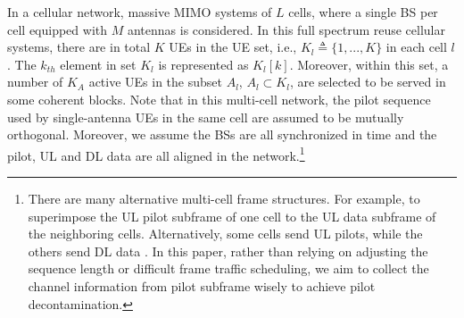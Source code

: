 In a cellular network, massive MIMO systems of $L$ cells, where a single BS per cell equipped 
with $M$ antennas is considered. %
In this full spectrum reuse cellular systems, there are in total $K$ UEs in the UE set, i.e., $K_l\triangleq\{1,...,K\}$ in each cell $l$. The $k_{th}$ element in set $K_l$ is represented as $K_l[k]$. Moreover, within this set, a number of $K_A$ active UEs in the subset $A_l$, $A_l\subset K_l$, are selected to be served in some coherent blocks. Note that in this multi-cell network, the pilot sequence used by single-antenna UEs in the same
cell are assumed to be mutually orthogonal. Moreover, we assume the BSs are all synchronized in time and the pilot, UL and DL data are all aligned in the network.\footnote{There are many alternative multi-cell frame structures. For example, to superimpose the UL pilot subframe of one cell to the  UL data subframe of the neighboring cells\cite{upadhya2017superimposed}. Alternatively, some cells send UL pilots, while the others send DL data \cite{fernandes2013inter}. In this paper, rather than relying on adjusting the sequence length or difficult frame traffic scheduling, we aim to collect the channel information from pilot subframe wisely to achieve pilot decontamination.} 
